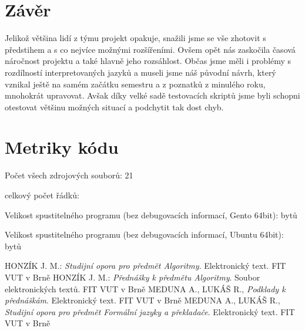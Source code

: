 \documentclass[12pt,a4paper,titlepage,final]{article}
\begin{document}
\section{Závěr} \label{zaver}
Jelikož většina lidí z týmu projekt opakuje, snažili jsme se vše zhotovit s předstihem a s co nejvíce možnými rozšířeními. Ovšem opět nás zaskočila časová náročnost projektu a také hlavně jeho rozsáhlost. Občas jsme měli i problémy s rozdílností interpretovaných jazyků a museli jsme náš původní návrh, který vznikal ještě na samém začátku semestru a z poznatků z minulého roku, mnohokrát upravovat. Avšak díky velké sadě testovacích skriptů jsme byli schopni otestovat většinu možných situací a podchytit tak dost chyb.

\appendix

\section{Metriky kódu} \label{metriky}
Počet všech zdrojových souborů: 21

celkový počet řádků: 

Velikost spustitelného programu (bez debugovacích informací, Gento 64bit): bytů

Velikost spustitelného programu (bez debugovacích informací, Ubuntu 64bit): bytů


\begin{thebibliography}{1}

HONZÍK J. M.: \emph{Studijní opora pro předmět Algoritmy}. Elektronický text. FIT VUT v Brně
HONZÍK J. M.: \emph{Přednášky k předmětu Algoritmy}. Soubor elektronických textů. FIT VUT v Brně
MEDUNA A., LUKÁŠ R., \emph{Podklady k přednáškám}. Elektronický text. FIT VUT v Brně
MEDUNA A., LUKÁŠ R., \emph{Studijní opora pro předmět Formální jazyky a překladače}. Elektronický text. FIT VUT v Brně


\end{thebibliography}
\appendix
\end{document}
